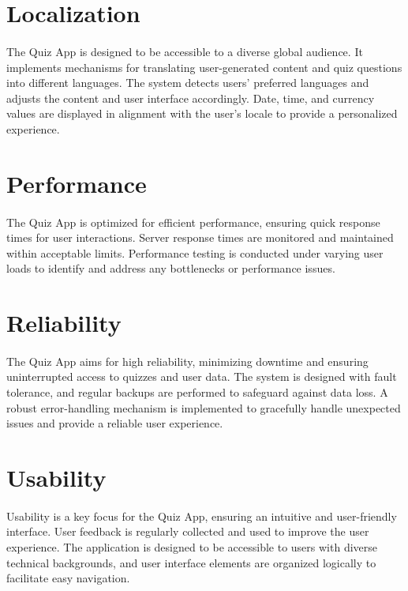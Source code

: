 \section{Localization}
\large{\paragraph{}
The Quiz App is designed to be accessible to a diverse global audience. It implements mechanisms for translating user-generated content and quiz questions into different languages. The system detects users' preferred languages and adjusts the content and user interface accordingly. Date, time, and currency values are displayed in alignment with the user's locale to provide a personalized experience.}

\section{Performance}
\large{\paragraph{}
The Quiz App is optimized for efficient performance, ensuring quick response times for user interactions. Server response times are monitored and maintained within acceptable limits. Performance testing is conducted under varying user loads to identify and address any bottlenecks or performance issues.}

\section{Reliability}
\large{\paragraph{}
The Quiz App aims for high reliability, minimizing downtime and ensuring uninterrupted access to quizzes and user data. The system is designed with fault tolerance, and regular backups are performed to safeguard against data loss. A robust error-handling mechanism is implemented to gracefully handle unexpected issues and provide a reliable user experience.}

\section{Usability}
\large{\paragraph{}
Usability is a key focus for the Quiz App, ensuring an intuitive and user-friendly interface. User feedback is regularly collected and used to improve the user experience. The application is designed to be accessible to users with diverse technical backgrounds, and user interface elements are organized logically to facilitate easy navigation.}

